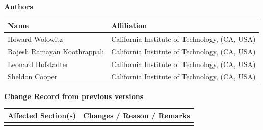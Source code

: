 \documentclass[12pt,a4paper]{article}
\begin{document}
\noindent
{\Large \bf Authors}
\medskip

\noindent
\begin{tabularx}{\textwidth}{|l|X|}
  \hline
      {\bf Name} & {\bf Affiliation}\\
      \hline
      Howard Wolowitz                 & California Institute of Technology, (CA, USA)\\
      Rajesh Ramayan Koothrappali     & California Institute of Technology, (CA, USA)\\
      Leonard Hofstadter              & California Institute of Technology, (CA, USA)\\
      Sheldon Cooper                  & California Institute of Technology, (CA, USA)\\
      \hline
\end{tabularx}

\vspace{3cm}

\noindent
{\Large \bf Change Record from previous versions}
\medskip

\noindent
\begin{tabularx}{\textwidth}{|l|X|}
  \hline
      {\bf Affected Section(s)} & {\bf Changes / Reason / Remarks}\\
      \hline
       & \\
      \hline
\end{tabularx}


\newpage
\tableofcontents \thispagestyle{fancy}


\newpage





\newpage
\listofreq \thispagestyle{fancy}

\listofquestion \thispagestyle{fancy}


\label{LastPage}
\end{document}

